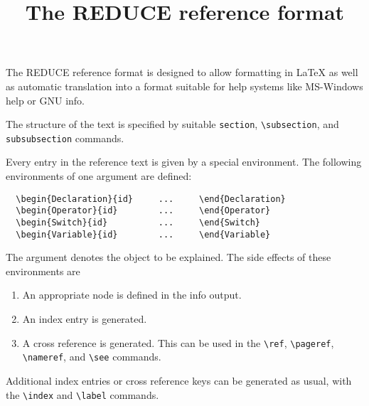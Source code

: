 
\title{The REDUCE reference format}





The REDUCE reference format is designed to allow formatting in
\LaTeX{} as well as automatic translation into a format suitable for
help systems like MS-Windows help or GNU info.

The structure of the text is specified by suitable \verb|section|,
\verb|\subsection|, and \verb|subsubsection| commands.

Every entry in the reference text is given by a special environment.
The following environments of one argument are defined:
\begin{verbatim}
  \begin{Declaration}{id}     ...     \end{Declaration}
  \begin{Operator}{id}        ...     \end{Operator}
  \begin{Switch}{id}          ...     \end{Switch}
  \begin{Variable}{id}        ...     \end{Variable}
\end{verbatim}
The argument denotes the object to be explained. The side effects of
these environments are
\begin{enumerate}
  \item An appropriate node is defined in the info output.
  \item An index entry is generated.
  \item A cross reference is generated. This can be used in the
        \verb|\ref|, \verb|\pageref|, \verb|\nameref|, and \verb|\see|
        commands.
\end{enumerate}
Additional index entries or cross reference keys can be generated as usual,
with the \verb|\index| and \verb|\label| commands.

